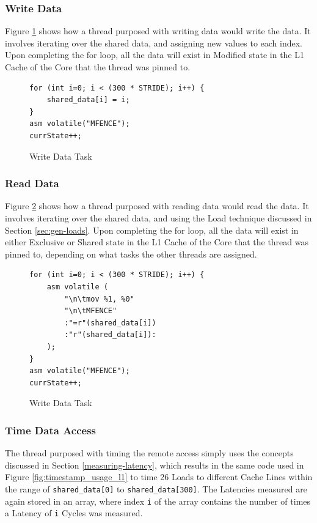 \documentclass[bsc,frontabs,twoside,singlespacing,parskip,deptreport]{infthesis}     %
\begin{document}
\subsubsection{Write Data}
Figure \ref{fig:write-data-task-code} shows how a thread purposed with writing data would write the data. It involves iterating over the shared data, and assigning new values to each index. Upon completing the for loop, all the data will exist in Modified state in the L1 Cache of the Core that the thread was pinned to.
\begin{figure}[!h]
    \centering
    \begin{minipage}{0.7\textwidth}
    \begin{verbatim}
for (int i=0; i < (300 * STRIDE); i++) {
    shared_data[i] = i;
}
asm volatile("MFENCE");
currState++;
    \end{verbatim}
    \end{minipage}
    \caption{Write Data Task}
    \label{fig:write-data-task-code}
\end{figure}

\subsubsection{Read Data}
Figure \ref{fig:read-data-task-code} shows how a thread purposed with reading data would read the data. It involves iterating over the shared data, and using the Load technique discussed in Section \ref{sec:gen-loads}. Upon completing the for loop, all the data will exist in either Exclusive or Shared state in the L1 Cache of the Core that the thread was pinned to, depending on what tasks the other threads are assigned.
\begin{figure}[!h]
    \centering
    \begin{minipage}{0.7\textwidth}
    \begin{verbatim}
for (int i=0; i < (300 * STRIDE); i++) {
    asm volatile (
        "\n\tmov %1, %0"
        "\n\tMFENCE"
        :"=r"(shared_data[i])
        :"r"(shared_data[i]):
    );
}
asm volatile("MFENCE");
currState++;
    \end{verbatim}
    \end{minipage}
    \caption{Write Data Task}
    \label{fig:read-data-task-code}
\end{figure}

\subsubsection{Time Data Access}\label{coherence-timing-task}
The thread purposed with timing the remote access simply uses the concepts discussed in Section \ref{measuring-latency}, which results in the same code used in Figure \ref{fig:timestamp_usage_l1} to time 26 Loads to different Cache Lines within the range of \texttt{shared\_data[0]} to \texttt{shared\_data[300]}. The Latencies measured are again stored in an array, where index \texttt{i} of the array contains the number of times a Latency of \texttt{i} Cycles was measured.
\end{document}
